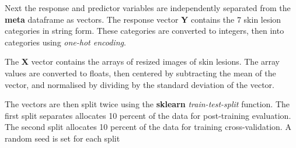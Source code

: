 \documentclass[11pt]{article}
\begin{document}
    Next the response and predictor variables are independently separated
from the \textbf{meta} dataframe as vectors. The response vector
\textbf{Y} contains the 7 skin lesion categories in string form. These
categories are converted to integers, then into categories using
\emph{one-hot encoding}.

The \textbf{X} vector contains the arrays of resized images of skin
lesions. The array values are converted to floats, then centered by
subtracting the mean of the vector, and normalised by dividing by the
standard deviation of the vector.

The vectors are then split twice using the \textbf{sklearn}
\emph{train-test-split} function. The first split separates allocates 10
percent of the data for post-training evaluation. The second split
allocates 10 percent of the data for training cross-validation. A random
seed is set for each split
\end{document}
